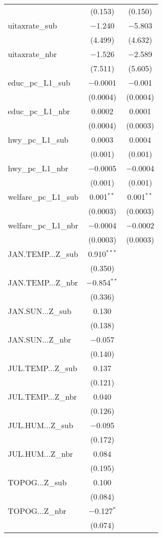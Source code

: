 \begin{table}[!htbp]
\begin{tabular}{@{\extracolsep{5pt}}lcc}
  & (0.153) & (0.150) \\ 
  uitaxrate\_sub & $-$1.240 & $-$5.803 \\ 
  & (4.499) & (4.632) \\ 
  uitaxrate\_nbr & $-$1.526 & $-$2.589 \\ 
  & (7.511) & (5.605) \\ 
  educ\_pc\_L1\_sub & $-$0.0001 & $-$0.001 \\ 
  & (0.0004) & (0.0004) \\ 
  educ\_pc\_L1\_nbr & 0.0002 & 0.0001 \\ 
  & (0.0004) & (0.0003) \\ 
  hwy\_pc\_L1\_sub & 0.0003 & 0.0004 \\ 
  & (0.001) & (0.001) \\ 
  hwy\_pc\_L1\_nbr & $-$0.0005 & $-$0.0004 \\ 
  & (0.001) & (0.001) \\ 
  welfare\_pc\_L1\_sub & 0.001$^{**}$ & 0.001$^{**}$ \\ 
  & (0.0003) & (0.0003) \\ 
  welfare\_pc\_L1\_nbr & $-$0.0004 & $-$0.0002 \\ 
  & (0.0003) & (0.0003) \\ 
  JAN.TEMP...Z\_sub & 0.910$^{***}$ &  \\ 
  & (0.350) &  \\ 
  JAN.TEMP...Z\_nbr & $-$0.854$^{**}$ &  \\ 
  & (0.336) &  \\ 
  JAN.SUN...Z\_sub & 0.130 &  \\ 
  & (0.138) &  \\ 
  JAN.SUN...Z\_nbr & $-$0.057 &  \\ 
  & (0.140) &  \\ 
  JUL.TEMP...Z\_sub & 0.137 &  \\ 
  & (0.121) &  \\ 
  JUL.TEMP...Z\_nbr & 0.040 &  \\ 
  & (0.126) &  \\ 
  JUL.HUM...Z\_sub & $-$0.095 &  \\ 
  & (0.172) &  \\ 
  JUL.HUM...Z\_nbr & 0.084 &  \\ 
  & (0.195) &  \\ 
  TOPOG...Z\_sub & 0.100 &  \\ 
  & (0.084) &  \\ 
  TOPOG...Z\_nbr & $-$0.127$^{*}$ &  \\ 
  & (0.074) &  \\ 

\end{tabular}
\end{table}
